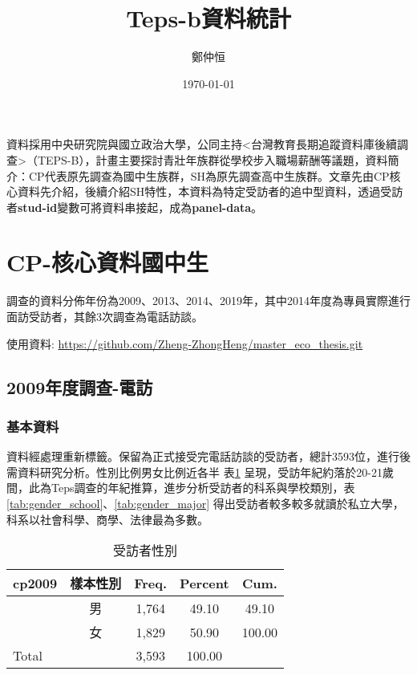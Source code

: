 \documentclass[12pt, a4paper]{article}
\title{ Teps-b資料統計}
\author{{\SM 鄭仲恒}}
\date{{\TT \today}}
\begin{document}
\maketitle
\fontsize{12}{22 pt}\selectfont
資料採用中央研究院與國立政治大學，公同主持<台灣教育長期追蹤資料庫後續調查>（TEPS-B），計畫主要探討青壯年族群從學校步入職場薪酬等議題，資料簡介：CP代表原先調查為國中生族群，SH為原先調查高中生族群。文章先由CP核心資料先介紹，後續介紹SH特性，本資料為特定受訪者的追中型資料，透過受訪者\textbf{stud-id}變數可將資料串接起，成為\textbf{panel-data}。



\section{CP-核心資料國中生}
調查的資料分佈年份為2009、2013、2014、2019年，其中2014年度為專員實際進行面訪受訪者，其餘3次調查為電話訪談。\par
使用資料: \url{https://github.com/Zheng-ZhongHeng/master_eco_thesis.git}
\subsection{2009年度調查-電訪}

\subsubsection{基本資料}
資料經處理重新標籤。保留為正式接受完電話訪談的受訪者，總計3593位，進行後需資料研究分析。性別比例男女比例近各半 表\ref{tab:gender} 呈現，受訪年紀約落於20-21歲間，此為Teps調查的年紀推算，進步分析受訪者的科系與學校類別，表 \ref{tab:gender_school}、\ref{tab:gender_major} 得出受訪者較多較多就讀於私立大學，科系以社會科學、商學、法律最為多數。


\begin{table}[htbp]
  \centering
   \caption{受訪者性別}
  \begin{adjustbox}{width=0.5\textwidth}
    \begin{tabular}{lcccc}
      \toprule
      cp2009 & 樣本性別 & Freq. & Percent & Cum. \\
      \midrule
      & 男 & 1,764 & 49.10 & 49.10 \\
      & 女 & 1,829 & 50.90 & 100.00 \\
      \midrule
      Total & & 3,593 & 100.00 & \\
      \bottomrule
    \end{tabular}
    \label{tab:gender}
  \end{adjustbox}
\end{table}
\end{document}
